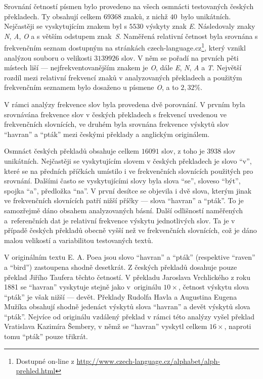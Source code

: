 \documentclass[dp.tex]{subfiles}
\begin{document}
Srovnání četností písmen bylo provedeno na všech osmnácti testovaných českých překladech. Ty obsahují celkem $69368$ znaků, z nichž $40$~bylo unikátních. Nejčastěji se vyskytujícím znakem byl s $5530$ výskyty znak \textit{E}. Následovaly znaky \textit{N}, \textit{A}, \textit{O} a s větším odstupem znak~\textit{S}. Naměřená relativní četnost byla srovnána s frekvenčním seznam dostupným na stránkách czech-language.cz\footnote{Dostupné on-line z \url{http://www.czech-language.cz/alphabet/alph-prehled.html}}, který vznikl analýzou souboru o velikosti $3 139 926$ slov. V něm se pořadí na prvních pěti místech liší --- nejfrekventovanějším znakem je \textit{O}, dále \textit{E}, \textit{N}, \textit{A} a \textit{T}. Největší rozdíl mezi relativní frekvencí znaků v analyzovaných překladech a použitým frekvenčním seznamem bylo dosaženo u písmene \textit{O}, a to $2{,}32\%$.

V rámci analýzy frekvence slov byla provedena dvě porovnání. V prvním byla srovnávána frekvence slov v českých překladech s frekvencí uvedenou ve frekvenčních slovnících, ve druhém byla srovnána frekvence výskytů slov \enquote{havran} a \enquote{pták} mezi českými překlady a anglickým originálem. 

Osmnáct českých překladů obsahuje celkem $16091$ slov, z toho je $3938$ slov unikátních. Nejčastěji se vyskytujícím slovem v českých překladech je slovo \enquote{v}, které se na předních příčkách umístilo i ve frekvenčních slovnících použitých pro srovnání. Dalšími často se vyskytujícími slovy byla slova \enquote{se}, sloveso \enquote{být}, spojka \enquote{a}, předložka \enquote{na}. V první desítce se objevila i dvě slova, kterým jinak ve frekvenčních slovnících patří nižší příčky --- slova \enquote{havran} a \enquote{pták}. To je samozřejmě dáno obsahem analyzovaných básní. Další odlišností naměřených a~referenčních dat je relativní frekvence výskytu jednotlivých slov. Ta je v případě českých překladů obecně vyšší než ve frekvenčních slovnících, což je dáno malou velikostí a variabilitou testovaných textů.

V originálním textu E. A. Poea jsou slovo \enquote{havran} a \enquote{pták} (respektive \enquote{raven} a \enquote{bird}) zastoupena shodně desetkrát. Z českých překladů dosahuje pouze překlad Jiřího Taufera těchto četností. V překladu Jaroslava Vrchlického z roku 1881 se \enquote{havran} vyskytuje stejně jako v~originálu $10\times$, četnost výskytu slova \enquote{pták} je však nižší --- devět. Překlady Rudolfa Havla a Augustina Eugena Mužíka obsahují shodně jedenáct výskytů slova \enquote{havran} a devět výskytů slova \enquote{pták}. Nejvíce od originálu vzdálený překlad v rámci této analýzy vyšel překlad Vratislava Kazimíra Šembery, v němž se \enquote{havran} vyskytl celkem $16\times$, naproti tomu \enquote{pták} pouze třikrát.
\end{document}
